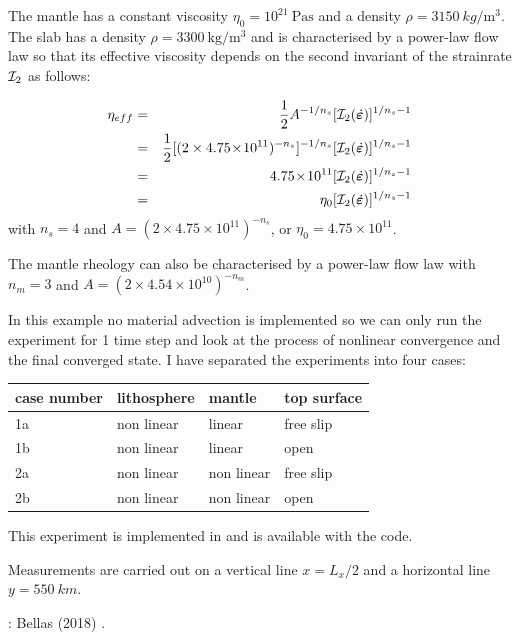 The mantle has a constant viscosity $\eta_0=10^{21}~\si{\pascal\second}$ 
and a density $\rho=3150~\si{kg\per\cubic\metre}$. 
The slab has a density $\rho=3300~\si{\kg\per\cubic\metre}$ 
and is characterised by a power-law flow law so that 
its effective viscosity depends on the second invariant of the strainrate 
${\cal I}_2$ as follows:

\begin{eqnarray}
\eta_{eff}
&=&\frac{1}{2} A^{-1/n_s} [{\cal I}_2(\dot{\bm \varepsilon})]^{1/n_s-1}  \\
&=&\frac{1}{2} [(2 \times 4.75\!\times\! 10^{11})^{-n_s}]^{-1/n_s} [{\cal I}_2(\dot{\bm \varepsilon})]   ^{1/n_s-1} \\
&=&4.75\!\times\! 10^{11} [{\cal I}_2(\dot{\bm \varepsilon})]^{1/n_s-1}  \\
&=& \eta_0 [{\cal I}_2(\dot{\bm \varepsilon})]^{1/n_s-1} 
\end{eqnarray}
with 
$n_s=4$ and $A=(2 \times 4.75\!\times\! 10^{11})^{-n_s}$, or $\eta_0=4.75\times 10^{11}$.


The mantle rheology can also be characterised by a power-law flow law with 
$n_m=3$ and $A=(2 \times 4.54\!\times\! 10^{10})^{-n_m}$.

In this example no material advection is implemented so we can only run the experiment for 1
time step and look at the process of nonlinear convergence and the final converged state.
I have separated the experiments into four cases:
\begin{center}
\begin{tabular}{llll}
\hline
case number & lithosphere & mantle & top surface \\
\hline\hline
1a & non linear & linear     & free slip  \\
1b & non linear & linear     & open\\
2a & non linear & non linear & free slip\\
2b & non linear & non linear & open \\ 
\hline
\end{tabular}
\end{center}

This experiment is implemented in \aspect and is available with the code. 

Measurements are carried out on a vertical line $x=L_x/2$ and a horizontal line $y=550~\si{km}$.

\Literature: Bellas \etal (2018) \cite{bezb18}.

\newpage
